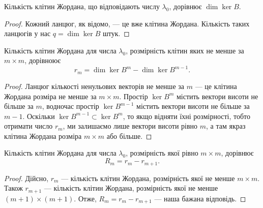 \documentclass{math_library}
\begin{document}
\begin{proposition}
Кількість клітин Жордана, що відповідають числу $\lambda_0$, дорівнює $\dim \ker B$.
\end{proposition}

\begin{proof}
Кожний ланцюг, як відомо, --- це вже клітина Жордана. Кількість таких ланцюгів у нас $q = \dim \ker B$ штук. 
\end{proof}

\begin{proposition}
Кількість клітин Жордана для числа $\lambda_0$, розмірність клітин яких не менше за $m \times m$, дорівноює 
\[
r_m = \dim \ker B^m - \dim \ker B^{m-1}.
\]
\end{proposition}

\begin{proof}
Ланцюг кількості ненульових векторів не менше за $m$ --- це клітина Жордана розміра не менше за $m \times m$. Простір $\ker B^m$ містить вектори висоти не більше за $m$, водночас простір $\ker B^{m-1}$ містить вектори висоти не більше за $m-1$. Оскільки $\ker B^{m-1} \subset \ker B^m$, то якщо відняти їхні розмірності, тобто отримати число $r_m$, ми залишаємо лише вектори висоти рівно $m$, а там якраз клітина Жордана розміра $m \times m$ або більше.
\end{proof}

\begin{proposition}
Кількість клітин Жордана для числа $\lambda_0$, розмірність якої рівно $m \times m$, дорівнює 
\[
R_m = r_m - r_{m+1}.
\]
\end{proposition}

\begin{proof}
Дійсно, $r_m$ --- кількість клітин Жордана, розмірність якої не менше $m \times m$. Також $r_{m+1}$ --- кількість клітин Жордана, розмірність якої не менше $(m+1) \times (m+1)$. Отже, $R_m = r_m - r_{m+1}$ --- наша бажана відповідь.
\end{proof}
\end{document}
